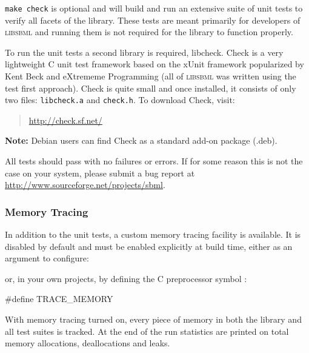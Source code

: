 \documentclass{cekmanual}
\begin{document}
\begin{example}[csh]
\end{example}


\texttt{make check} is optional and will build and run an extensive
suite of unit tests to verify all facets of the library.  These tests
are meant primarily for developers of \textsc{libsbml} and running
them is not required for the library to function properly.

To run the unit tests a second library is required, libcheck.  Check
is a very lightweight C unit test framework based on the xUnit
framework popularized by Kent Beck and eXtrememe Programming (all of
\textsc{libsbml} was written using the test first approach).  Check is
quite small and once installed, it consists of only two files:
\texttt{libcheck.a} and \texttt{check.h}.  To download Check, visit:

\begin{quote}
\url{http://check.sf.net/}
\end{quote}

\textbf{Note:} Debian users can find Check as a standard add-on
package (.deb).

All tests should pass with no failures or errors.  If for some reason
this is not the case on your system, please submit a bug report at
\url{http://www.sourceforge.net/projects/sbml}.


\subsubsection{Memory Tracing}

In addition to the unit tests, a custom memory tracing facility is
available.  It is disabled by default and must be enabled explicitly
at build time, either as an argument to configure:

\begin{example}[csh]
\end{example}

or, in your own projects, by defining the C preprocessor symbol
:

\begin{example}[c]
  #define TRACE_MEMORY
\end{example}

With memory tracing turned on, every piece of memory in both the
library and all test suites is tracked.  At the end of the run
statistics are printed on total memory allocations, deallocations and
leaks.
\end{document}
